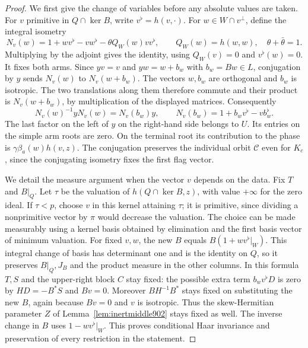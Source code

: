\documentclass[a4paper,11pt]{article}
\theoremstyle{definition}
\theoremstyle{remark}
\numberwithin{equation}{section}
\begin{document}
\begin{proof}
We first give the change of variables before any absolute values
are taken. For \(v\) primitive in \(Q\cap\ker B\), write
\(v^\flat=h(v,\cdot)\). For \(w\in W\cap v^\perp\), define the
integral isometry
\[
       N_v(w)=1+w v^\flat-vw^\flat-\theta Q_W(w)v v^\flat,
       \qquad Q_W(w)=h(w,w),\quad \theta+\bar\theta=1 .
\]
Multiplying by the adjoint gives the identity, using \(Q_W(v)=0\)
and \(v^\flat(w)=0\). It fixes both arms. Since \(yv=v\) and
\(yw=w+b_w\) with \(b_w=Bw\in L\), conjugation by \(y\) sends
\(N_v(w)\) to \(N_v(w+b_w)\). The vectors \(w,b_w\) are
orthogonal and \(b_w\) is isotropic. The two translations along
them therefore commute and their product is \(N_v(w+b_w)\),
by multiplication of the displayed matrices. Consequently
\begin{equation}
     N_v(w)^{-1}yN_v(w)=N_v(b_w)y,\qquad
                 N_v(b_w)=1+b_w v^\flat-v b_w^\flat .
 \label{eq:inertconj903}
\end{equation}
The last factor on the left of \(y\) on the right-hand side
belongs to \(U\). Its entries on the simple arm roots are zero.
On the terminal root its contribution to the phase is
\(\gamma\beta_a(w)h(v,z)\). The conjugation preserves the
individual orbit \(\mathcal C\) even for \(K_c\), since the
conjugating isometry fixes the first flag vector.

We detail the measure argument when the vector \(v\) depends on
the data. Fix \(T\) and \(B|_Q\). Let \(\tau\) be the valuation
of \(h(Q\cap\ker B,z)\), with value \(+\infty\) for the zero
ideal. If \(\tau<p\), choose \(v\) in this kernel attaining
\(\tau\); it is primitive, since dividing a nonprimitive vector
by \(\pi\) would decrease the valuation. The choice can be made
measurably using a kernel basis obtained by elimination and the
first basis vector of minimum valuation. For fixed \(v,w\),
the new \(B\) equals \(B(1+w v^\flat|_W)\).
This integral change of basis has determinant one and is the
identity on \(Q\), so it preserves \(B|_Q,J_B\) and the product
measure in the other columns. In this formula \(T,S\) and
the upper-right block \(C\) stay fixed: the possible extra
term \(b_w v^\flat D\) is zero by \(HD=-B^*S\) and \(Bv=0\).
Moreover \(BH^{-1}B^*\) stays fixed on substituting the new
\(B\), again because \(Bv=0\) and \(v\) is isotropic. Thus the
skew-Hermitian parameter \(Z\) of Lemma~\ref{lem:inertmiddle902}
stays fixed as well. The inverse change in \(B\) uses
\(1-w v^\flat|_W\). This proves conditional Haar invariance
and preservation of every restriction in the statement.


\end{proof}
\end{document}
